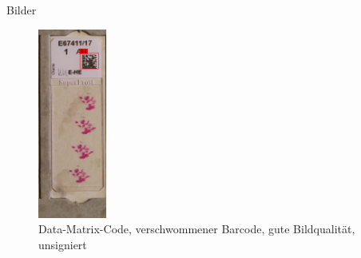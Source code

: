 \documentclass{beamer}
\begin{document}
\begin{frame}{Bilder}
\begin{figure}
      \includegraphics[width=0.2\textwidth]{./assets/Cell102723_1_4_top1_prosconsminweight.PNG}
      \caption{Data-Matrix-Code, verschwommener Barcode, gute Bildqualität, unsigniert}
    \end{figure}
  \end{frame}
\end{document}
